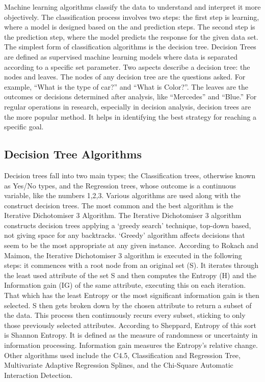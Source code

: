\documentclass[10pt,conference,a4paper]{IEEEtran}
\begin{document}
Machine learning algorithms classify the data to understand and interpret it more objectively. The classification process involves two steps: the first step is learning, where a model is designed based on the and prediction steps. The second step is the prediction step, where the model predicts the response for the given data set. The simplest form of classification algorithms is the decision tree. Decision Trees are defined as supervised machine learning models where data is separated according to a specific set parameter. Two aspects describe a decision tree: the nodes and leaves. The nodes of any decision tree are the questions asked. For example, “What is the type of car?” and “What is Color?”. The leaves are the outcomes or decisions determined after analysis, like “Mercedes” and “Blue.” For regular operations in research, especially in decision analysis, decision trees are the more popular method. It helps in identifying the best strategy for reaching a specific goal. 



\subsection{Decision Tree Algorithms}

Decision trees fall into two main types; the Classification trees, otherwise known as Yes/No types, and the Regression trees, whose outcome is a continuous variable, like the numbers 1,2,3. Various algorithms are used along with the construct decision trees. The most common and the best algorithm is the Iterative Dichotomiser 3 Algorithm. The Iterative Dichotomiser 3 algorithm constructs decision trees applying a ‘greedy search’ technique, top-down based, not giving space for any backtracks\cite{sheppard2017}.  ‘Greedy’ algorithm affects decisions that seem to be the most appropriate at any given instance. According to Rokach and Maimon\cite{rokach2014}, the Iterative Dichotomiser 3 algorithm is executed in the following steps: it commences with a root node from an original set (S). It iterates through the least used attribute of the set S and then computes the Entropy (H) and the Information gain (IG) of the same attribute, executing this on each iteration. That which has the least Entropy or the most significant information gain is then selected. S then gets broken down by the chosen attribute to return a subset of the data. This process then continuously recurs every subset, sticking to only those previously selected attributes. According to Sheppard\cite{sheppard2017},  Entropy of this sort is Shannon Entropy. It is defined as the measure of randomness or uncertainty in information processing. Information gain measures the Entropy’s relative change. Other algorithms used include the C4.5, Classification and Regression Tree, Multivariate Adaptive Regression Splines, and the Chi-Square Automatic Interaction Detection. 
\end{document}
